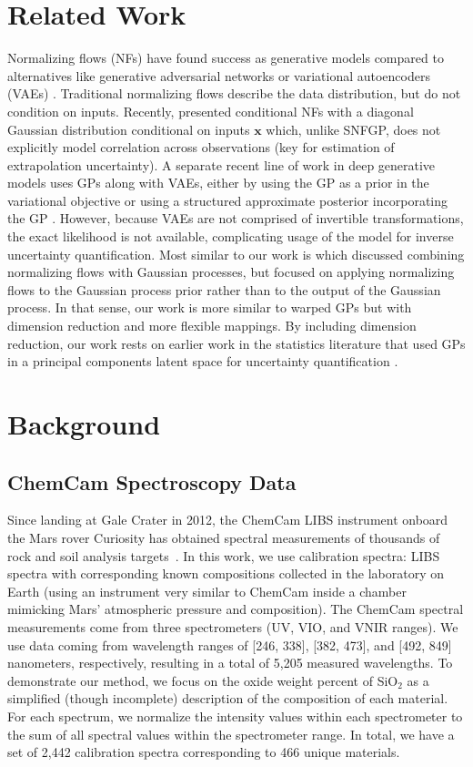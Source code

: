 \documentclass[letterpaper]{article} %
\begin{document}
\section{Related Work}
Normalizing flows (NFs) have found success as generative models compared to alternatives like generative adversarial networks or variational autoencoders (VAEs) \cite{rezende2015variational, papamakarios2019normalizing}.
Traditional normalizing flows describe the data distribution, but do not condition on inputs.
Recently, \cite{winkler2019learning} presented conditional NFs with a diagonal Gaussian distribution conditional on inputs $\mathbf{x}$ which, unlike SNFGP, does not explicitly model correlation across observations (key for estimation of extrapolation uncertainty).
A separate recent line of work in deep generative models uses GPs along with VAEs, either by using the GP as a prior in the variational objective or using a structured approximate posterior incorporating the GP \cite{casale2018gaussian,pearce2020gaussian}.
However, because VAEs are not comprised of invertible transformations, the exact likelihood is not available, complicating usage of the model for inverse uncertainty quantification.
Most similar to our work is \cite{maronas2021transforming} which discussed combining normalizing flows with Gaussian processes, but focused on applying normalizing flows to the Gaussian process prior rather than to the output of the Gaussian process.
In that sense, our work is more similar to warped GPs \cite{snelson2004warped} but with dimension reduction and more flexible mappings.
By including dimension reduction, our work rests on earlier work in the statistics literature that used GPs in a principal components latent space for uncertainty quantification \cite{higdon2008computer}.

\section{Background}
\subsection{ChemCam Spectroscopy Data}
Since landing at Gale Crater in 2012, the ChemCam LIBS instrument onboard the Mars rover Curiosity has obtained spectral measurements of thousands of rock and soil analysis targets~\cite{maurice2016chemcam}.
In this work, we use calibration spectra: LIBS spectra with corresponding known compositions collected in the laboratory on Earth (using an instrument very similar to ChemCam inside a chamber mimicking Mars' atmospheric pressure and composition).
The ChemCam spectral measurements come from three spectrometers (UV, VIO, and VNIR ranges).
We use data coming from wavelength ranges of [246, 338], [382, 473], and [492, 849] nanometers, respectively, resulting in a total of 5,205 measured wavelengths.
To demonstrate our method, we focus on the oxide weight percent of SiO$_2$ as a simplified (though incomplete) description of the composition of each material.
For each spectrum, we normalize the intensity values within each spectrometer to the sum of all spectral values within the spectrometer range.
In total, we have a set of 2,442 calibration spectra corresponding to 466 unique materials.
\end{document}
